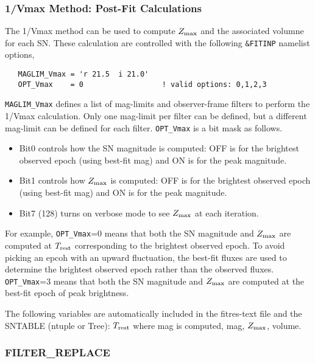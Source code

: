 \documentclass[12pt]{article}
\newcommand{\Trest}{T_{\rm rest}}
\newcommand{\zmax}{Z_{\rm max}}
\begin{document}
 \clearpage
  \subsubsection{1/Vmax Method: Post-Fit Calculations}
  \label{sss:Vmax}

The 1/Vmax method can be used to compute $\zmax$ and the
associated volumne for each SN.
These calculation are controlled with the
following {\tt \&FITINP} namelist options,
%
\begin{verbatim}
   MAGLIM_Vmax = 'r 21.5  i 21.0'
   OPT_Vmax    = 0                  ! valid options: 0,1,2,3
\end{verbatim}
%
{\tt MAGLIM\_Vmax} defines a list of mag-limits and 
observer-frame filters to perform the 1/Vmax calculation. 
Only one mag-limit per filter can be defined, 
but a different mag-limit can be defined for each filter.
{\tt OPT\_Vmax} is a bit mask as follows.
\begin{itemize}
  \item Bit0 controls how the SN magnitude is computed:
        OFF is for the brightest observed epoch (using best-fit mag)
        and ON is for the peak magnitude.
  \item Bit1 controls how $\zmax$ is computed:
        OFF is for the brightest observed epoch (using best-fit mag)
        and ON is for the peak magnitude.
  \item Bit7 (128) turns on verbose mode to see $\zmax$ at each iteration.
\end{itemize}
% 
For example, {\tt OPT\_Vmax}=0 means that both the SN magnitude 
and $\zmax$ are computed at $\Trest$ corresponding to the
brightest observed epoch. To avoid picking an epcoh with
an upward fluctuation, the best-fit fluxes are used to determine
the brightest observed epoch rather than the observed fluxes.
{\tt OPT\_Vmax}=3 means that both the SN magnitude and $\zmax$
are computed at the best-fit epoch of peak brightness.

The following variables are automatically included in the
fitres-text file and the SNTABLE (ntuple or Tree):
$\Trest$ where mag is computed, mag, $\zmax$, volume.


  \clearpage
  \subsubsection{FILTER\_REPLACE}
  \label{sss:filter_replace}
\end{document}
